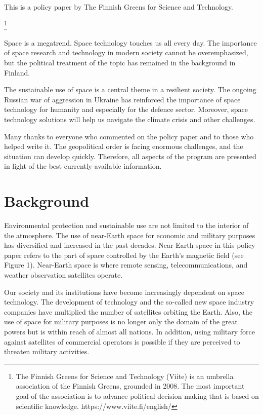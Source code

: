 \documentclass[nobib,finnish,oneside,openany,notoc,a4paper]{tufte-book}
\begin{document}
This is a policy paper by The Finnish Greens for Science and
Technology.{\footnote{The Finnish Greens for Science and
  Technology (Viite) is an umbrella association of the Finnish Greens,
  grounded in 2008. The most important goal of the association is to
  advance political decision making that is based on scientific
  knowledge. https://www.viite.fi/english/}

Space is a megatrend. Space technology touches us all every day. The
importance of space research and technology in modern society cannot be
overemphasized, but the political treatment of the topic has remained in
the background in Finland.

The sustainable use of space is a central theme in a resilient society.
The ongoing Russian war of aggression in Ukraine has reinforced the
importance of space technology for humanity and especially for the
defence sector. Moreover, space technology solutions will help us
navigate the climate crisis and other challenges.

Many thanks to everyone who commented on the policy paper and to those
who helped write it. The geopolitical order is facing enormous
challenges, and the situation can develop quickly. Therefore, all
aspects of the program are presented in light of the best currently
available information.


  \chapter{Background}

Environmental protection and sustainable use are not limited to the
interior of the atmosphere. The use of near-Earth space for economic and
military purposes has diversified and increased in the past decades.
Near-Earth space in this policy paper refers to the part of space
controlled by the Earth's magnetic field (see Figure 1). Near-Earth
space is where remote sensing, telecommunications, and weather
observation satellites operate.

Our society and its institutions have become increasingly dependent on
space technology. The development of technology and the so-called new
space industry companies have multiplied the number of satellites
orbiting the Earth. Also, the use of space for military purposes is no
longer only the domain of the great powers but is within reach of almost
all nations. In addition, using military force against satellites of
commercial operators is possible if they are perceived to threaten
military activities.

}
\end{document}
